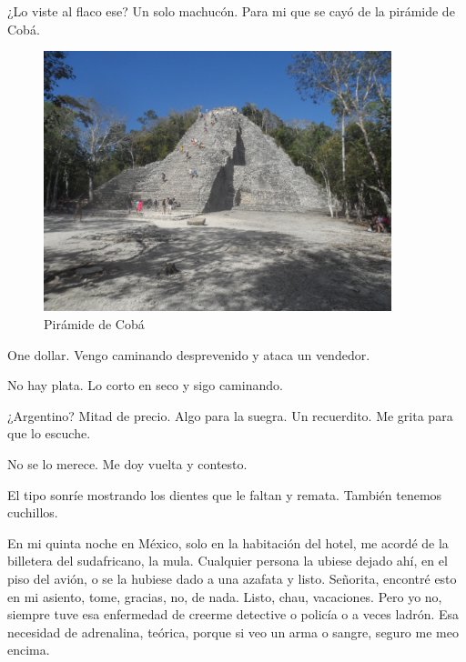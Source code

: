\documentclass[11pt,twoside,openright,a6paper]{book}
\begin{document}
¿Lo viste al flaco ese? Un solo machucón. Para mi que se cayó de la
pirámide de Cobá.

\begin{figure}[H]
  \centering
    \includegraphics[width=0.9\textwidth]{fotos/2012/coba}
  \caption{Pirámide de Cobá}
  \label{Pirámide de Cobá}
\end{figure}


\vspace{0.5cm}
\hrulefill\hspace{0.2cm} \decofourleft\decofourright \hspace{0.2cm} \hrulefill
\vspace{0.5cm}

One dollar. Vengo caminando desprevenido y ataca un vendedor.

No hay plata. Lo corto en seco y sigo caminando.

¿Argentino? Mitad de precio. Algo para la suegra. Un recuerdito. Me grita
para que lo escuche.

No se lo merece. Me doy vuelta y contesto.

El tipo sonríe mostrando los dientes que le faltan y remata. También
tenemos cuchillos.


\vspace{0.5cm}
\hrulefill\hspace{0.2cm} \decofourleft\decofourright \hspace{0.2cm} \hrulefill
\vspace{0.5cm}

En mi quinta noche en México, solo en la habitación del hotel, me acordé
de la billetera del sudafricano, la mula. Cualquier persona la ubiese
dejado ahí, en el piso del avión, o se la hubiese dado a una azafata
y listo. Señorita, encontré esto en mi asiento, tome, gracias, no, de
nada. Listo, chau, vacaciones. Pero yo no, siempre tuve esa enfermedad de
creerme detective o policía o a veces ladrón. Esa necesidad de adrenalina,
teórica, porque si veo un arma o sangre, seguro me meo encima.
\end{document}

